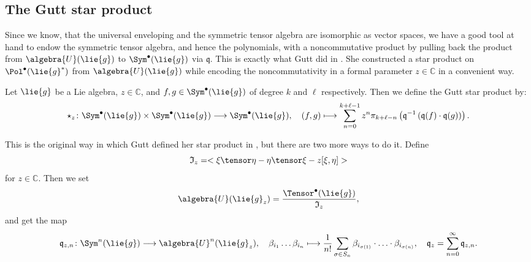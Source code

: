 \subsection{The Gutt star product}
Since we know, that the universal enveloping and the symmetric tensor 
algebra are isomorphic as vector spaces, we have a good tool at hand to 
endow the symmetric tensor algebra, and hence the polynomials, with a 
noncommutative product by pulling back the product from $\algebra{U}
(\lie{g})$ to $\Sym^{\bullet}(\lie{g})$ via $\mathfrak{q}$. This is exactly 
what Gutt did in \cite{gutt:1983a}. She constructed a star product on 
$\Pol^{\bullet}(\lie{g}^*)$ from $\algebra{U}(\lie{g})$ while encoding the 
noncommutativity in a formal parameter $z \in \mathbb{C}$ in a convenient 
way. 
\begin{definition}
	\label{Def:GuttStar}
	Let $\lie{g}$ be a Lie algebra, $z \in \mathbb{C}$, and 
	$f, g \in \Sym^{\bullet}(\lie{g})$ of degree $k$ and $\ell$ 
	respectively. Then we define the Gutt star product by:
	\begin{equation}
		\star_z
		\colon
		\Sym^{\bullet}(\lie{g})
		\times
		\Sym^{\bullet}(\lie{g})
		\longrightarrow
		\Sym^{\bullet}(\lie{g})
		, \quad
		(f,g)
		\longmapsto
		\sum\limits_{n = 0}^{k + \ell - 1}
		z^n
		\pi_{k + \ell - n}
		\left(
			\mathfrak{q}^{-1} \left(
				\mathfrak{q}(f) \cdot \mathfrak{q}(g)
			\right)
		\right).
	\end{equation}
\end{definition}
This is the original way in which Gutt defined her star product in 
\cite{gutt:1983a}, but there are two more ways to do it. Define
\begin{equation*}
	\mathfrak{I}_z
	=
	< \xi \tensor \eta - \eta \tensor \xi - z [\xi, \eta] >
\end{equation*}
for $z \in \mathbb{C}$. Then we set 
\begin{equation}
	\label{Alg:DeformedUnivEnvAlg}
	\algebra{U}(\lie{g}_z)
	=
	\frac{\Tensor^{\bullet}(\lie{g})}{\mathfrak{I}_z},
\end{equation}
and get the map
\begin{equation}
	\label{Alg:DeformedQuantization}
	\mathfrak{q}_{z,n}
	\colon
	\Sym^n(\lie{g})
	\longrightarrow
	\algebra{U}^n(\lie{g}_z)
	, \quad
	\beta_{i_1} \ldots \beta_{i_n}
	\longmapsto
	\frac{1}{n!}
	\sum\limits_{\sigma \in S_n}
	\beta_{i_{\sigma(1)}} 
	\cdot \ldots \cdot
	\beta_{i_{\sigma(n)}}
	, \quad
	\mathfrak{q}_z
	=
	\sum\limits_{n = 0}^{\infty}
	\mathfrak{q}_{z, n}.
\end{equation}
